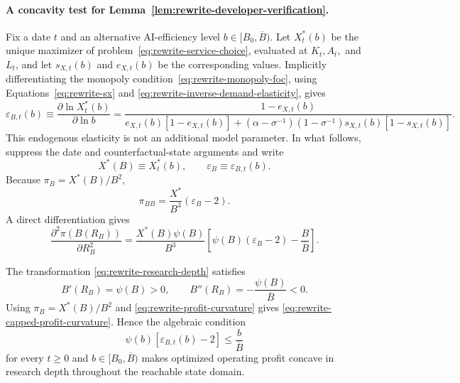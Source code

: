 \paragraph{A concavity test for
Lemma~\ref{lem:rewrite-developer-verification}.}
Fix a date $t$ and an alternative AI-efficiency level
$b\in[B_0,\overline B)$. Let $X_t^*(b)$ be the unique maximizer of
problem~\eqref{eq:rewrite-service-choice}, evaluated at $K_t,A_t,$ and $L_t$,
and let $s_{X,t}(b)$ and $e_{X,t}(b)$ be the corresponding values. Implicitly
differentiating the monopoly condition~\eqref{eq:rewrite-monopoly-foc}, using
Equations~\eqref{eq:rewrite-sx} and
\eqref{eq:rewrite-inverse-demand-elasticity}, gives
\begin{equation}
 \varepsilon_{B,t}(b)\equiv
 \frac{\partial\ln X_t^*(b)}{\partial\ln b}
 =\frac{1-e_{X,t}(b)}{e_{X,t}(b)[1-e_{X,t}(b)]
 +(\alpha-\sigma^{-1})(1-\sigma^{-1})
 s_{X,t}(b)[1-s_{X,t}(b)]}.
 \label{eq:rewrite-service-capability-elasticity}
\end{equation}
This endogenous elasticity is not an additional model parameter. In what
follows, suppress the date and counterfactual-state arguments and write
\[
 X^*(B)\equiv X_t^*(b),
 \qquad
 \varepsilon_B\equiv\varepsilon_{B,t}(b).
\]
Because \(\pi_B=X^*(B)/B^2\),
\begin{equation}
 \pi_{BB}=\frac{X^*}{B^3}(\varepsilon_B-2).
 \label{eq:rewrite-profit-curvature}
\end{equation}
A direct differentiation gives
\begin{equation}
 \frac{\partial^2\pi(B(R_B))}{\partial R_B^2}
 =\frac{X^*(B)\psi(B)}{B^3}
 \left[\psi(B)(\varepsilon_B-2)
 -\frac{B}{\overline B}\right].
 \label{eq:rewrite-capped-profit-curvature}
\end{equation}

The transformation \eqref{eq:rewrite-research-depth} satisfies
\[
 B'(R_B)=\psi(B)>0,
 \qquad
 B''(R_B)=-\frac{\psi(B)}{\overline B}<0.
\]
Using \(\pi_B=X^*(B)/B^2\) and \eqref{eq:rewrite-profit-curvature} gives
\eqref{eq:rewrite-capped-profit-curvature}. Hence the algebraic condition
\begin{equation}
 \psi(b)[\varepsilon_{B,t}(b)-2]
 \leq\frac{b}{\overline B}
 \label{eq:rewrite-capped-concavity-gate}
\end{equation}
for every $t\geq0$ and $b\in[B_0,\overline B)$ makes optimized operating
profit concave in research depth throughout the reachable state domain.

